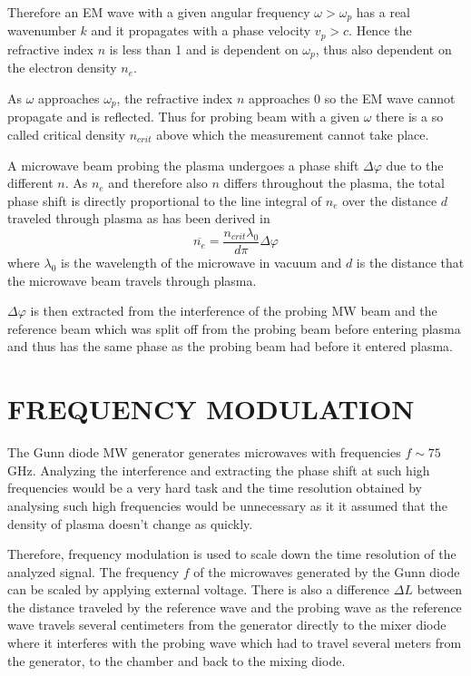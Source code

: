 \documentclass[a4paper,twoside]{articlek}
\begin{document}
Therefore an EM wave with a given angular frequency $\omega>\omega_p$ has a real wavenumber $k$ and it propagates with a phase velocity $v_p>c$. Hence the refractive index $n$ is less than 1 and is dependent on $\omega_p$, thus also dependent on the electron density $n_e$. 

As $\omega$ approaches $\omega_p$, the refractive index $n$ approaches 0 so the EM wave cannot propagate and is reflected. Thus for probing beam with a given $\omega$ there is a so called critical density $n_{crit}$ above which the measurement cannot take place.


A microwave beam probing the plasma undergoes a phase shift $\Delta \varphi$ due to the different $n$.  
As $n_e$ and therefore also $n$ differs throughout the plasma, the total phase shift is directly proportional to the line integral of $n_e$ over the distance $d$ traveled through plasma as has been derived in \cite{mateju}
\begin{equation}
    \overline{n_e}=\frac{ n_{crit}\lambda_0 }{d \pi}\Delta \varphi
    \label{eq:ne}
\end{equation}
where $\lambda_0$ is the wavelength of the microwave in vacuum and $d$ is the distance that the microwave beam travels through plasma. 

$\Delta \varphi$ is then extracted from the interference of the probing MW beam and the reference beam which was split off from the probing beam before entering plasma and thus has the same phase as the probing beam had before it entered plasma.

\section{FREQUENCY MODULATION}

The Gunn diode MW generator generates microwaves with frequencies $f \sim 75$ GHz. Analyzing the interference and extracting the phase shift at such high frequencies would be a very hard task and the time resolution obtained by analysing such high frequencies would be unnecessary as it it assumed that the density of plasma doesn't change as quickly.

Therefore, frequency modulation is used to scale down the time resolution of the analyzed signal. The frequency $f$ of the microwaves generated by the Gunn diode can be scaled by applying external voltage. There is also a difference $\Delta L$ between the distance traveled by the reference wave and the probing wave as the reference wave travels several centimeters from the generator directly to the mixer diode where it interferes with the probing wave which had to travel several meters from the generator, to the chamber and back to the mixing diode.
\end{document}
